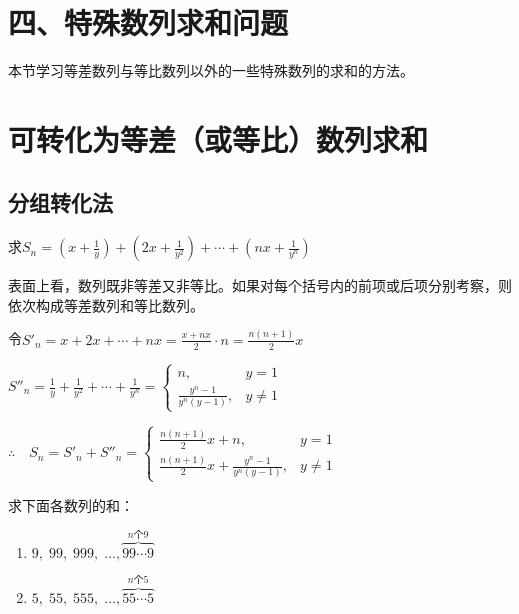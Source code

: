 \section*{四、特殊数列求和问题}
本节学习等差数列与等比数列以外的一些特殊数列的求和的方法。

\section{可转化为等差（或等比）数列求和}

\subsection{分组转化法}


\begin{example}
    求$S_n=\left(x+\frac{1}{y}\right)+\left(2x+\frac{1}{y^2}\right)+\cdots+\left(nx+\frac{1}{y^n}\right)$
\end{example}


\begin{analyze}
    表面上看，数列既非等差又非等比。如果对每个括号内的前项或后项分别考察，则依次构成等差数列和等比数列。
\end{analyze}

\begin{solution}
令$S'_n=x+2x+\cdots+nx=\frac{x+nx}{2}\cdot n=\frac{n(n+1)}{2}x$

$S''_n=\frac{1}{y}+\frac{1}{y^2}+\cdots+\frac{1}{y^n}=\begin{cases}
    n,& y=1\\[1.5ex]
    \frac{y^n-1}{y^n(y-1)},& y\ne 1
\end{cases}$

$\therefore\quad S_n=S'_n+S''_n=\begin{cases}
    \frac{n(n+1)}{2}x+n,& y=1\\[1.5ex]
    \frac{n(n+1)}{2}x+\frac{y^n-1}{y^n(y-1)},& y\ne 1
\end{cases}$
\end{solution}

\begin{example}
    求下面各数列的和：
\begin{multicols}{2}
\begin{enumerate}[(1)]
    \item $9,\; 99,\; 999,\; \ldots, \overbrace{99\cdots 9}^{\text{$n$个9}}$
    \item $5,\; 55,\; 555,\; \ldots, \overbrace{55\cdots 5}^{\text{$n$个5}}$
\end{enumerate}
\end{multicols}
\end{example}

